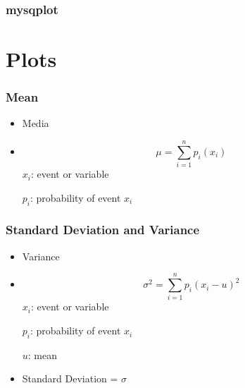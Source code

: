 \documentclass{beamer}
\begin{document}
\begin{frame}
\frametitle{mysqplot}
\begin{center}
\end{center}
\end{frame}
\section{Plots}

\begin{frame}
\frametitle{Mean}
\begin{itemize}
\item
Media
\item
\begin{equation}
\mu = \sum_{i=1}^{n} p_i (x_i)
\end{equation}
$x_i$: event or variable

$p_i$: probability of event $x_i$
\end{itemize}
\end{frame}


\begin{frame}
\frametitle{Standard Deviation and Variance}
\begin{itemize}
\item
Variance
\item 
\begin{equation} 
{\sigma}^{2}=\sum_{i=1}^{n} p_i {(x_i - u)}^{2}
\end{equation}
$x_i$: event or variable

$p_i$: probability of event $x_i$

$u$: mean

\item 
Standard Deviation = $\sigma$

\end{itemize}
\end{frame}
\end{document}
